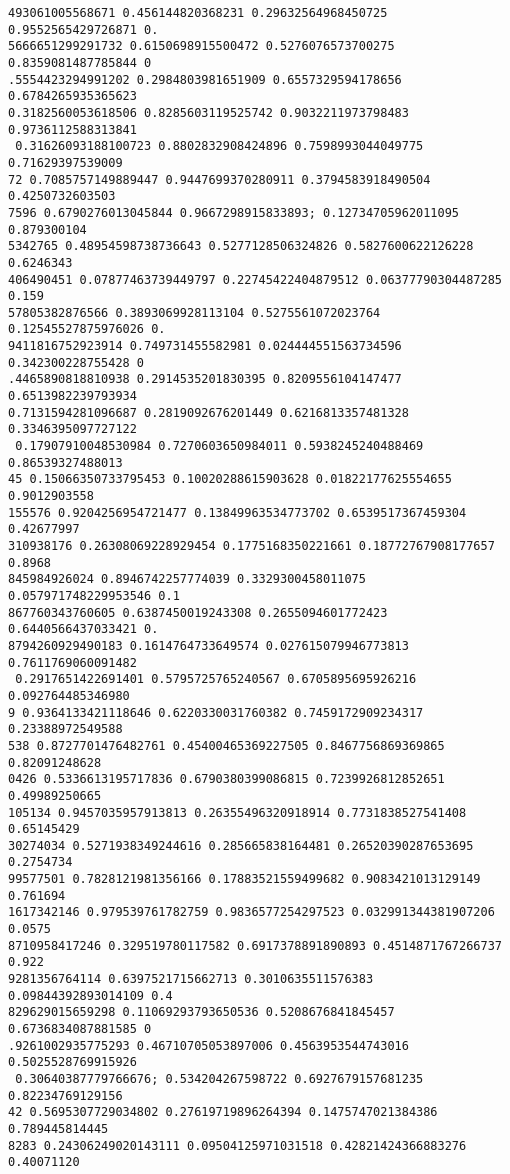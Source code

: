 \documentclass[12pt,a4paper]{article}
\begin{document}
\begin{lstlisting}
493061005568671 0.456144820368231 0.29632564968450725 0.9552565429726871 0.
5666651299291732 0.6150698915500472 0.5276076573700275 0.8359081487785844 0
.5554423294991202 0.2984803981651909 0.6557329594178656 0.6784265935365623 
0.3182560053618506 0.8285603119525742 0.9032211973798483 0.9736112588313841
 0.31626093188100723 0.8802832908424896 0.7598993044049775 0.71629397539009
72 0.7085757149889447 0.9447699370280911 0.3794583918490504 0.4250732603503
7596 0.6790276013045844 0.9667298915833893; 0.12734705962011095 0.879300104
5342765 0.48954598738736643 0.5277128506324826 0.5827600622126228 0.6246343
406490451 0.07877463739449797 0.22745422404879512 0.06377790304487285 0.159
57805382876566 0.3893069928113104 0.5275561072023764 0.12545527875976026 0.
9411816752923914 0.749731455582981 0.024444551563734596 0.342300228755428 0
.4465890818810938 0.2914535201830395 0.8209556104147477 0.6513982239793934 
0.7131594281096687 0.2819092676201449 0.6216813357481328 0.3346395097727122
 0.17907910048530984 0.7270603650984011 0.5938245240488469 0.86539327488013
45 0.15066350733795453 0.10020288615903628 0.01822177625554655 0.9012903558
155576 0.9204256954721477 0.13849963534773702 0.6539517367459304 0.42677997
310938176 0.26308069228929454 0.1775168350221661 0.18772767908177657 0.8968
845984926024 0.8946742257774039 0.3329300458011075 0.057971748229953546 0.1
867760343760605 0.6387450019243308 0.2655094601772423 0.6440566437033421 0.
8794260929490183 0.1614764733649574 0.027615079946773813 0.7611769060091482
 0.2917651422691401 0.5795725765240567 0.6705895695926216 0.092764485346980
9 0.9364133421118646 0.6220330031760382 0.7459172909234317 0.23388972549588
538 0.8727701476482761 0.45400465369227505 0.8467756869369865 0.82091248628
0426 0.5336613195717836 0.6790380399086815 0.7239926812852651 0.49989250665
105134 0.9457035957913813 0.26355496320918914 0.7731838527541408 0.65145429
30274034 0.5271938349244616 0.285665838164481 0.26520390287653695 0.2754734
99577501 0.7828121981356166 0.17883521559499682 0.9083421013129149 0.761694
1617342146 0.979539761782759 0.9836577254297523 0.032991344381907206 0.0575
8710958417246 0.329519780117582 0.6917378891890893 0.4514871767266737 0.922
9281356764114 0.6397521715662713 0.3010635511576383 0.09844392893014109 0.4
829629015659298 0.11069293793650536 0.5208676841845457 0.6736834087881585 0
.9261002935775293 0.46710705053897006 0.4563953544743016 0.5025528769915926
 0.30640387779766676; 0.534204267598722 0.6927679157681235 0.82234769129156
42 0.5695307729034802 0.27619719896264394 0.1475747021384386 0.789445814445
8283 0.24306249020143111 0.09504125971031518 0.42821424366883276 0.40071120

\end{lstlisting}
\end{document}
